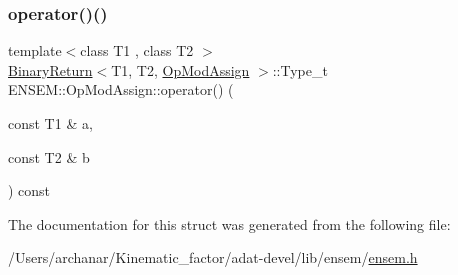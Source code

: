 \subsubsection{\texorpdfstring{operator()()}{operator()()}\hspace{0.1cm}{\footnotesize\ttfamily [3/3]}}
{\footnotesize\ttfamily template$<$class T1 , class T2 $>$ \\
\mbox{\hyperlink{structENSEM_1_1BinaryReturn}{Binary\+Return}}$<$T1, T2, \mbox{\hyperlink{structENSEM_1_1OpModAssign}{Op\+Mod\+Assign}} $>$\+::Type\+\_\+t E\+N\+S\+E\+M\+::\+Op\+Mod\+Assign\+::operator() (\begin{DoxyParamCaption}\item[{const T1 \&}]{a,  }\item[{const T2 \&}]{b }\end{DoxyParamCaption}) const\hspace{0.3cm}{\ttfamily [inline]}}



The documentation for this struct was generated from the following file\+:\begin{DoxyCompactItemize}
\item 
/\+Users/archanar/\+Kinematic\+\_\+factor/adat-\/devel/lib/ensem/\mbox{\hyperlink{adat-devel_2lib_2ensem_2ensem_8h}{ensem.\+h}}\end{DoxyCompactItemize}
